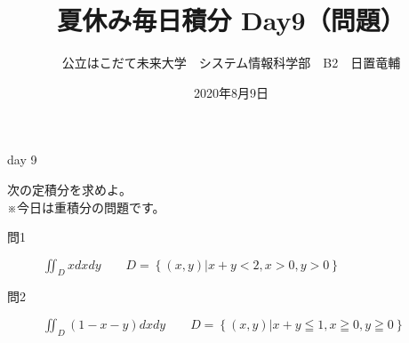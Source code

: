 \documentclass[dvipdfmx,uplatex]{jsarticle}
\title{夏休み毎日積分 Day9（問題）}
\author{公立はこだて未来大学　システム情報科学部　B2　日置竜輔}
\date{2020年8月9日}
\begin{document}
\maketitle

\begin{itembox}[c]{day 9}
    \begin{center}
        次の定積分を求めよ。\\
        ※今日は重積分の問題です。
    \end{center}
\end{itembox}

\begin{description}
    \item [問1] $\displaystyle \iint_D xdxdy \qquad D = \left\{(x, y) | x + y < 2 , x > 0, y > 0 \right\} $
\end{description}

\begin{description}
    \item [問2] $\displaystyle \iint_D (1 - x - y)dxdy \qquad D = \left\{ (x, y) | x + y \leqq  1 , x \geqq 0, y \geqq 0 \right\}$
\end{description}
\end{document}
